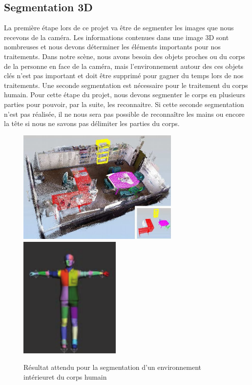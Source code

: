 \subsection{Segmentation 3D}
La première étape lors de ce projet va être de segmenter les images que nous recevons de 
la caméra. Les informations contenues dans une image 3D sont nombreuses et nous devons
déterminer les éléments importants pour nos traitements. Dans notre scène,
nous avons besoin des objets proches ou du corps de la personne en face de la caméra, mais 
l'environnement autour des ces objets clés n'est pas important et doit être supprimé pour
gagner du temps lors de nos traitements.
Une seconde segmentation est nécessaire pour le traitement du corps humain. Pour cette étape du projet,
nous devons segmenter le corps en plusieurs parties pour pouvoir, par la suite, les reconnaitre. Si cette
seconde segmentation n'est pas réalisée, il ne nous sera pas possible de reconnaître les mains ou encore
la tête si nous ne savons pas délimiter les parties du corps.  

\begin{figure}[!ht]
  \begin{center}
    \includegraphics[width=8cm]{image/segmentation.png}
    \includegraphics[width=5cm]{image/bodySegmentation.png}
    \caption[The LOF caption]{Résultat attendu pour la segmentation d'un environnement intérieur\footnotemark et du corps humain}
  \end{center}
\end{figure}
 
